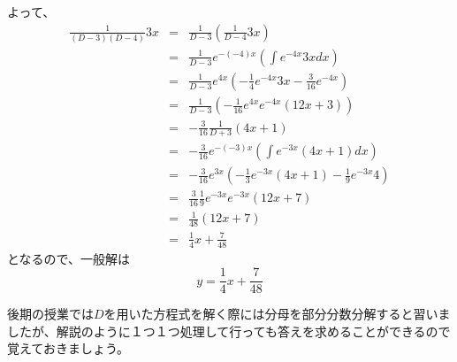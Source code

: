 \documentclass[dvipdfmx,uplatex]{jsarticle}
\begin{document}
\begin{spacing}{1.6}
\begin{qparts}
   よって、
   \begin{eqnarray*}
     \frac{1}{(D - 3)(D - 4)}3x & = & \frac{1}{D - 3} \left(\frac{1}{D - 4}3x\right) \\
     & = & \frac{1}{D - 3}e ^ {-(-4)x}\left(\int e ^ {-4x}3xdx\right) \\
     & = & \frac{1}{D - 3}e ^ {4x} \left(-\frac{1}{4}e ^ {-4x}3x - \frac{3}{16}e ^ {-4x}\right) \\
     & = & \frac{1}{D - 3} \left(-\frac{1}{16}e ^ {4x}e ^ {-4x} (12x + 3)\right) \\
     & = & -\frac{3}{16} \frac{1}{D + 3}(4x + 1) \\
     & = & -\frac{3}{16} e ^{-(-3)x} \left(\int e ^ {-3x}(4x + 1) dx \right) \\
     & = & -\frac{3}{16}e ^ {3x} \left(-\frac{1}{3}e ^ {-3x}(4x + 1) - \frac{1}{9}e ^ {-3x} 4 \right) \\
     & = & \frac{3}{16} \frac{1}{9}e ^ {-3x}e ^ {-3x}(12x + 7) \\
     & = & \frac{1}{48}(12x + 7) \\
     & = & \frac{1}{4}x + \frac{7}{48}
   \end{eqnarray*}
   となるので、一般解は
   \begin{equation*}
     y = \frac{1}{4}x + \frac{7}{48}
   \end{equation*}
  \end{qparts}
  \end{spacing}
  \begin{shadebox}
    後期の授業では$D$を用いた方程式を解く際には分母を部分分数分解すると習いましたが、解説のように１つ１つ処理して行っても答えを求めることができるので覚えておきましょう。
  \end{shadebox}
\end{document}
